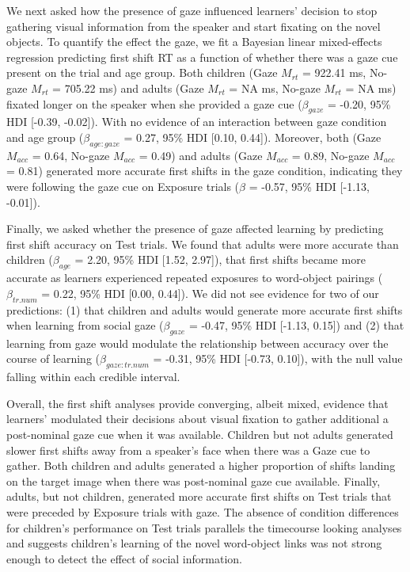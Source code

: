 \documentclass[man,floatsintext]{apa6}
\begin{document}
We next asked how the presence of gaze influenced learners' decision to
stop gathering visual information from the speaker and start fixating on
the novel objects. To quantify the effect the gaze, we fit a Bayesian
linear mixed-effects regression predicting first shift RT as a function
of whether there was a gaze cue present on the trial and age group. Both
children (Gaze \(M_{rt}\) = 922.41 ms, No-gaze \(M_{rt}\) = 705.22 ms)
and adults (Gaze \(M_{rt}\) = NA ms, No-gaze \(M_{rt}\) = NA ms) fixated
longer on the speaker when she provided a gaze cue (\(\beta_{gaze}\) =
-0.20, 95\% HDI {[}-0.39, -0.02{]}). With no evidence of an interaction
between gaze condition and age group (\(\beta_{age:gaze}\) = 0.27, 95\%
HDI {[}0.10, 0.44{]}). Moreover, both (Gaze \(M_{acc}\) = 0.64, No-gaze
\(M_{acc}\) = 0.49) and adults (Gaze \(M_{acc}\) = 0.89, No-gaze
\(M_{acc}\) = 0.81) generated more accurate first shifts in the gaze
condition, indicating they were following the gaze cue on Exposure
trials (\(\beta\) = -0.57, 95\% HDI {[}-1.13, -0.01{]}).

Finally, we asked whether the presence of gaze affected learning by
predicting first shift accuracy on Test trials. We found that adults
were more accurate than children (\(\beta_{age}\) = 2.20, 95\% HDI
{[}1.52, 2.97{]}), that first shifts became more accurate as learners
experienced repeated exposures to word-object pairings
(\(\beta_{tr.num}\) = 0.22, 95\% HDI {[}0.00, 0.44{]}). We did not see
evidence for two of our predictions: (1) that children and adults would
generate more accurate first shifts when learning from social gaze
(\(\beta_{gaze}\) = -0.47, 95\% HDI {[}-1.13, 0.15{]}) and (2) that
learning from gaze would modulate the relationship between accuracy over
the course of learning (\(\beta_{gaze:tr.num}\) = -0.31, 95\% HDI
{[}-0.73, 0.10{]}), with the null value falling within each credible
interval.

Overall, the first shift analyses provide converging, albeit mixed,
evidence that learners' modulated their decisions about visual fixation
to gather additional a post-nominal gaze cue when it was available.
Children but not adults generated slower first shifts away from a
speaker's face when there was a Gaze cue to gather. Both children and
adults generated a higher proportion of shifts landing on the target
image when there was post-nominal gaze cue available. Finally, adults,
but not children, generated more accurate first shifts on Test trials
that were preceded by Exposure trials with gaze. The absence of
condition differences for children's performance on Test trials
parallels the timecourse looking analyses and suggests children's
learning of the novel word-object links was not strong enough to detect
the effect of social information.
\end{document}
